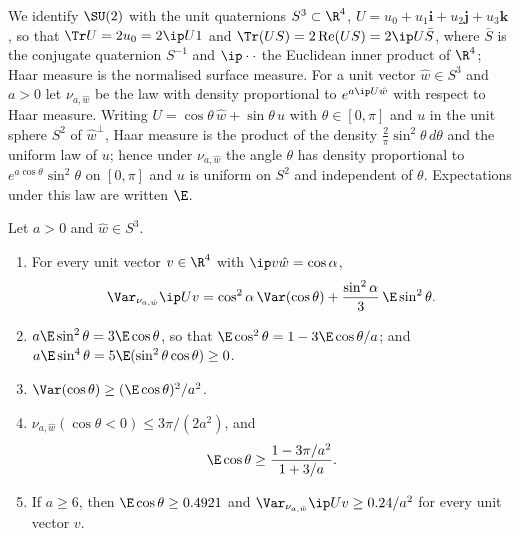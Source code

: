 We identify $\SU(2)$ with the unit quaternions $S^3\subset\R^4$, $U=u_0+u_1
\mathbf i+u_2\mathbf j+u_3\mathbf k$, so that $\Tr U=2u_0=2\ip U1$ and
$\Tr(US)=2\operatorname{Re}(US)=2\ip U{\bar S}$, where $\bar S$ is the
conjugate quaternion $S^{-1}$ and $\ip\cdot\cdot$ the Euclidean inner
product of $\R^4$; Haar measure is the normalised surface measure. For a
unit vector $\hat w\in S^3$ and $a>0$ let $\nu_{a,\hat w}$ be the law with
density proportional to $e^{a\ip U{\hat w}}$ with respect to Haar measure.
Writing $U=\cos\theta\,\hat w+\sin\theta\,u$ with $\theta\in[0,\pi]$ and
$u$ in the unit sphere $S^2$ of $\hat w^\perp$, Haar measure is the product
of the density $\frac2\pi\sin^2\theta\,d\theta$ and the uniform law of $u$;
hence under $\nu_{a,\hat w}$ the angle $\theta$ has density proportional to
$e^{a\cos\theta}\sin^2\theta$ on $[0,\pi]$ and $u$ is uniform on $S^2$ and
independent of $\theta$. Expectations under this law are written $\E$.

\begin{lemma}\label{rD:vmf}
Let $a>0$ and $\hat w\in S^3$.
\begin{enumerate}[label=\textup{(\roman*)},leftmargin=*]
\item For every unit vector $v\in\R^4$ with $\ip v{\hat w}=\cos\alpha$,
\[
\Var_{\nu_{a,\hat w}}\ip Uv=\cos^2\alpha\,\Var(\cos\theta)+\frac{\sin^2
\alpha}3\,\E\sin^2\theta .
\]
\item $a\E\sin^2\theta=3\E\cos\theta$, so that $\E\cos^2\theta=1-3\E\cos
\theta/a$; and $a\E\sin^4\theta=5\E(\sin^2\theta\cos\theta)\ge0$.
\item $\Var(\cos\theta)\ge(\E\cos\theta)^2/a^2$.
\item $\nu_{a,\hat w}(\cos\theta<0)\le3\pi/(2a^2)$, and
\[
\E\cos\theta\ge\frac{1-3\pi/a^2}{1+3/a}.
\]
\item If $a\ge6$, then $\E\cos\theta\ge0.4921$ and $\Var_{\nu_{a,\hat w}}
\ip Uv\ge0.24/a^2$ for every unit vector $v$.
\end{enumerate}
\end{lemma}

